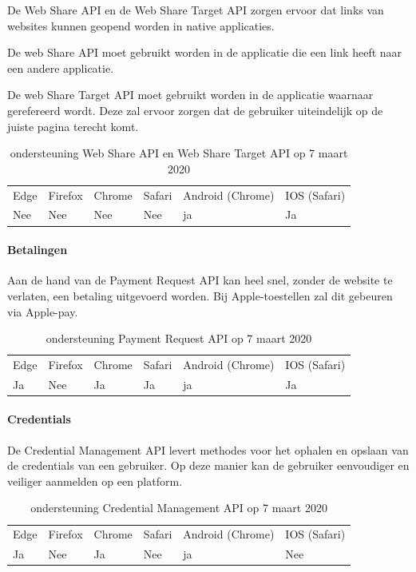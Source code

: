 De Web Share API \autocite{Giuca2019} en de Web Share Target API \autocite{Williger2019} zorgen ervoor dat links van websites kunnen geopend worden in native applicaties. 

De web Share API moet gebruikt worden in de applicatie die een link heeft naar een andere applicatie.

De web Share Target API moet gebruikt worden in de applicatie waarnaar gerefereerd wordt. Deze zal ervoor zorgen dat de gebruiker uiteindelijk op de juiste pagina terecht komt.

\begin{table}[H]
	\centering
	\begin{tabular}{llllll}
		Edge & Firefox & Chrome & Safari & Android (Chrome) & IOS (Safari) \\
		Nee   & Nee      &  Nee     & Nee     & ja               & Ja          
	\end{tabular}	
	\caption{ondersteuning Web Share API en Web Share Target API op 7 maart 2020}
\end{table}



\paragraph{Betalingen}
Aan de hand van de Payment Request API \autocite{Denicola2019} kan heel snel, zonder de website te verlaten, een betaling uitgevoerd worden. Bij Apple-toestellen zal dit gebeuren via Apple-pay. 

\begin{table}[H]
	\centering
	\begin{tabular}{llllll}
		Edge & Firefox & Chrome & Safari & Android (Chrome) & IOS (Safari) \\
		Ja   & Nee      &  Ja     & Ja     & ja               & Ja          
	\end{tabular}	
	\caption{ondersteuning Payment Request API op 7 maart 2020}
\end{table}


\paragraph{Credentials}
De Credential Management API \autocite{West2019} levert methodes voor het ophalen en opslaan van de credentials van een gebruiker. Op deze manier kan de gebruiker eenvoudiger en veiliger aanmelden op een platform.

\begin{table}[H]
	\begin{tabular}{llllll}
		Edge & Firefox & Chrome & Safari & Android (Chrome) & IOS (Safari) \\
		Ja   & Nee      &  Ja     & Nee     & ja               & Nee          
	\end{tabular}	
	\caption{ondersteuning Credential Management API op 7 maart 2020}
\end{table}

